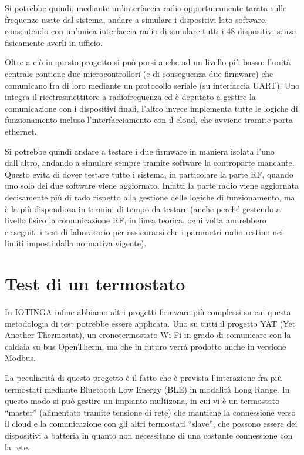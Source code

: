 \documentclass[12pt,a4paper,twoside,titlepage]{book}
\begin{document}
Si potrebbe quindi, mediante un'interfaccia radio opportunamente tarata sulle frequenze usate
dal sistema, andare a simulare i dispositivi lato software, consentendo con un'unica interfaccia
radio di simulare tutti i 48 dispositivi senza fisicamente averli in ufficio.

Oltre a ciò in questo progetto si può porsi anche ad un livello più basso: l'unità
centrale contiene due microcontrollori (e di conseguenza due firmware) che comunicano fra di
loro mediante un protocollo seriale (su interfaccia UART). Uno integra il ricetrasmettitore
a radiofrequenza ed è deputato a gestire la comunicazione con i dispositivi
finali, l'altro invece implementa tutte le logiche di funzionamento incluso l'interfacciamento
con il cloud, che avviene tramite porta ethernet.

Si potrebbe quindi andare a testare i due firmware in maniera isolata l'uno dall'altro,
andando a simulare sempre tramite software la controparte mancante. Questo evita di dover
testare tutto i sistema, in particolare la parte RF, quando uno solo dei due software viene
aggiornato. Infatti la parte radio viene aggiornata decisamente più di rado rispetto alla
gestione delle logiche di funzionamento, ma è la più dispendiosa in termini di tempo da testare
(anche perché gestendo a livello fisico la comunicazione RF, in linea teorica, ogni volta andrebbero
rieseguiti i test di laboratorio per assicurarsi che i parametri radio restino nei limiti
imposti dalla normativa vigente).

\section{Test di un termostato}

In IOTINGA infine abbiamo altri progetti firmware più complessi su cui questa metodologia
di test potrebbe essere applicata. Uno su tutti il progetto YAT (Yet Another Thermostat),
un cronotermostato Wi-Fi in grado di comunicare con la caldaia su bus OpenTherm, ma
che in futuro verrà prodotto anche in versione Modbus.

La peculiarità di questo progetto è il fatto che è prevista l'interazione fra più
termostati mediante Bluetooth Low Energy (BLE) in modalità Long Range. In questo modo
si può gestire un impianto multizona, in cui vi è un termostato ``master'' (alimentato
tramite tensione di rete) che mantiene la connessione verso il cloud e la comunicazione
con gli altri termostati ``slave'', che possono essere dei dispositivi a batteria
in quanto non necessitano di una costante connessione con la rete.
\end{document}
